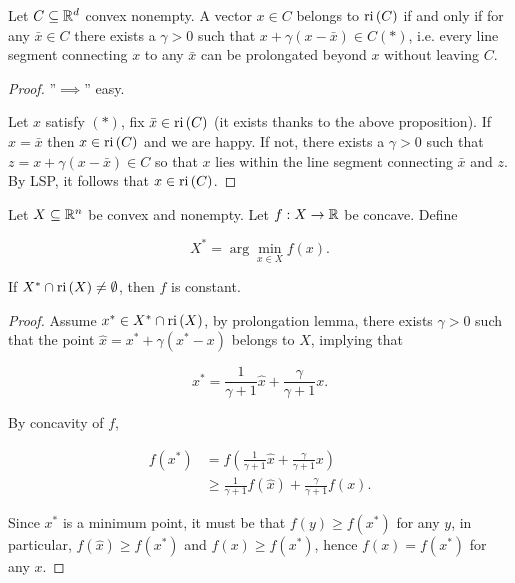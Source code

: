 \begin{lemma}

    Let $C \subseteq \mathbb{R}^d$ convex nonempty. A vector $x \in C$ belongs to $\mathrm{ri}\left(C\right)$ if and only if for any $\bar{x} \in C$ there exists a $\gamma > 0$ such that $x + \gamma(x - \bar{x}) \in C (*)$, i.e. every line segment connecting $x$ to any $\bar{x}$ can be prolongated beyond $x$ without leaving $C$.
    
\end{lemma}

\begin{proof}
    
    ''$\implies$'' easy. 

    Let $x$ satisfy $(*)$, fix $\bar{x} \in \mathrm{ri}\left(C\right)$ (it exists thanks to the above proposition). If $x = \bar{x}$ then $x \in \mathrm{ri}\left(C\right)$ and we are happy. If not, there exists a $\gamma > 0$ such that $z = x + \gamma(x-\bar{x}) \in C$ so that $x$ lies within the line segment connecting $\bar{x}$ and $z$. By LSP, it follows that $x \in \mathrm{ri}\left(C\right)$.

\end{proof}

\begin{proposition}
    
    Let $X \subseteq {\mathbb{R}^n}$ be convex and nonempty. Let $f : X \to \mathbb{R}$ be concave. Define 

    \[ X^* = \arg\min_{x \in X} f(x). \]

    If $X^* \cap \mathrm{ri}\left(X\right) \neq \emptyset$, then $f$ is constant.

\end{proposition}

\begin{proof}
    
    Assume $x^* \in X^* \cap \mathrm{ri}\left(X\right)$, by prolongation lemma, there exists $\gamma > 0$ such that the point $\hat{x} = x^* +\gamma(x^* - x)$ belongs to $X$, implying that

    \[ x^* = \frac{1}{\gamma + 1}\hat{x} + \frac{\gamma}{\gamma + 1}x. \]

    By concavity of $f$, 

    \begin{align*}
        f(x^*) &= f(\frac{1}{\gamma + 1}\hat{x} + \frac{\gamma}{\gamma + 1}x) \\ 
            &\ge \frac{1}{\gamma+1} f(\hat{x}) + \frac{\gamma}{\gamma+1}f(x). 
    \end{align*}

    Since $x^*$ is a minimum point, it must be that $f(y) \ge f(x^*)$ for any $y$, in particular, $f(\hat{x}) \ge f(x^*)$ and $f(x) \ge f(x^*)$, hence $f(x) = f(x^*)$ for any $x$.

\end{proof}

